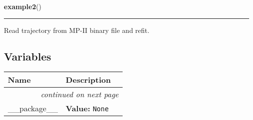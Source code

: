    \label{gbltst:example2}

    \vspace{0.5ex}

\hspace{.8\funcindent}\begin{boxedminipage}{\funcwidth}

    \raggedright \textbf{example2}()

    \vspace{-1.5ex}

    \rule{\textwidth}{0.5\fboxrule}
\setlength{\parskip}{2ex}
    Read trajectory from MP-II binary file and refit.

\setlength{\parskip}{1ex}
    \end{boxedminipage}



  \subsection{Variables}

    \vspace{-1cm}
\hspace{\varindent}\begin{longtable}{|p{\varnamewidth}|p{\vardescrwidth}|l}
\cline{1-2}
\cline{1-2} \centering \textbf{Name} & \centering \textbf{Description}& \\
\cline{1-2}
\endhead\cline{1-2}\multicolumn{3}{r}{\small\textit{continued on next page}}\\\endfoot\cline{1-2}
\endlastfoot\raggedright \_\-\_\-p\-a\-c\-k\-a\-g\-e\-\_\-\_\- & \raggedright \textbf{Value:} 
{\tt None}&\\
\cline{1-2}
\end{longtable}

